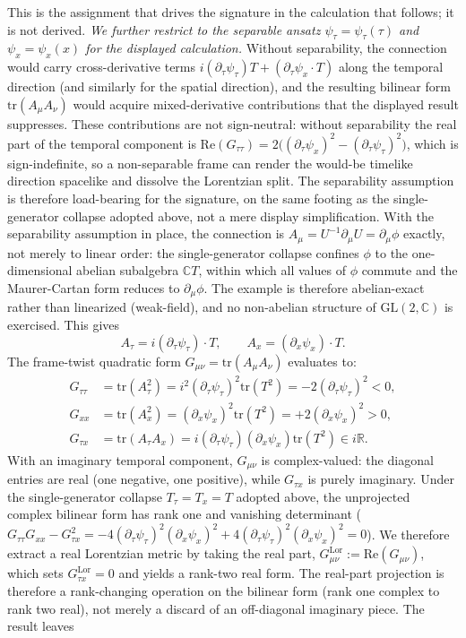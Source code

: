\documentclass[11pt]{article}
\begin{document}
This is the assignment that drives the signature in the calculation that follows; it is not derived. \emph{We further restrict to the separable ansatz $\psi_\tau = \psi_\tau(\tau)$ and $\psi_x = \psi_x(x)$ for the displayed calculation.} Without separability, the connection would carry cross-derivative terms $i(\partial_\tau \psi_\tau)T + (\partial_\tau \psi_x \cdot T)$ along the temporal direction (and similarly for the spatial direction), and the resulting bilinear form $\mathrm{tr}(A_\mu A_\nu)$ would acquire mixed-derivative contributions that the displayed result suppresses. These contributions are not sign-neutral: without separability the real part of the temporal component is $\mathrm{Re}(G_{\tau\tau}) = 2\big((\partial_\tau \psi_x)^2 - (\partial_\tau \psi_\tau)^2\big)$, which is sign-indefinite, so a non-separable frame can render the would-be timelike direction spacelike and dissolve the Lorentzian split. The separability assumption is therefore load-bearing for the signature, on the same footing as the single-generator collapse adopted above, not a mere display simplification. With the separability assumption in place, the connection is $A_\mu = U^{-1}\partial_\mu U = \partial_\mu \phi$ exactly, not merely to linear order: the single-generator collapse confines $\phi$ to the one-dimensional abelian subalgebra $\mathbb{C}T$, within which all values of $\phi$ commute and the Maurer-Cartan form reduces to $\partial_\mu \phi$. The example is therefore abelian-exact rather than linearized (weak-field), and no non-abelian structure of $\mathrm{GL}(2, \mathbb{C})$ is exercised. This gives
\begin{equation}
A_\tau = i(\partial_\tau \psi_\tau) \cdot T, \qquad A_x = (\partial_x \psi_x) \cdot T.
\end{equation}
The frame-twist quadratic form $G_{\mu\nu} = \mathrm{tr}(A_\mu A_\nu)$ evaluates to:
\begin{align}
G_{\tau\tau} &= \mathrm{tr}(A_\tau^2) = i^2 (\partial_\tau \psi_\tau)^2 \mathrm{tr}(T^2) = -2(\partial_\tau \psi_\tau)^2 < 0, \\
G_{xx} &= \mathrm{tr}(A_x^2) = (\partial_x \psi_x)^2 \mathrm{tr}(T^2) = +2(\partial_x \psi_x)^2 > 0, \\
G_{\tau x} &= \mathrm{tr}(A_\tau A_x) = i(\partial_\tau \psi_\tau)(\partial_x \psi_x)\mathrm{tr}(T^2) \in i\mathbb{R}.
\end{align}
With an imaginary temporal component, $G_{\mu\nu}$ is complex-valued: the diagonal entries are real (one negative, one positive), while $G_{\tau x}$ is purely imaginary. Under the single-generator collapse $T_\tau = T_x = T$ adopted above, the unprojected complex bilinear form has rank one and vanishing determinant ($G_{\tau\tau} G_{xx} - G_{\tau x}^2 = -4(\partial_\tau\psi_\tau)^2(\partial_x\psi_x)^2 + 4(\partial_\tau\psi_\tau)^2(\partial_x\psi_x)^2 = 0$). We therefore extract a real Lorentzian metric by taking the real part, $G^{\mathrm{Lor}}_{\mu\nu} := \mathrm{Re}(G_{\mu\nu})$, which sets $G^{\mathrm{Lor}}_{\tau x} = 0$ and yields a rank-two real form. The real-part projection is therefore a rank-changing operation on the bilinear form (rank one complex to rank two real), not merely a discard of an off-diagonal imaginary piece. The result leaves
\end{document}
